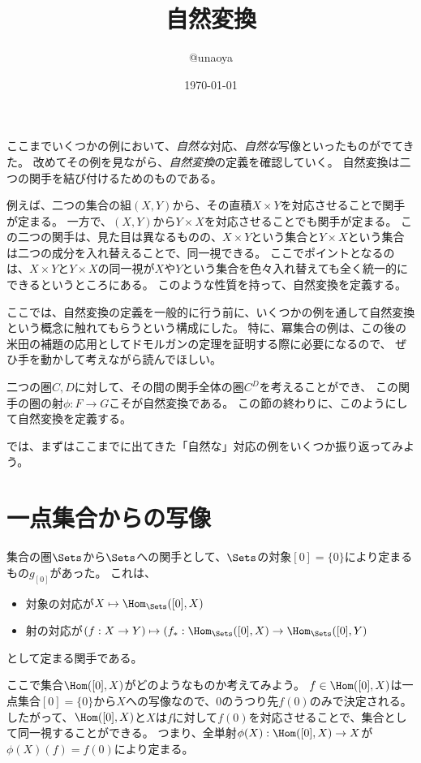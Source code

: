 \documentclass{jsarticle}
\title{自然変換}
\author{@unaoya}
\date{\today}
\begin{document}
\maketitle

ここまでいくつかの例において、\emph{自然な}対応、\emph{自然な}写像といったものがでてきた。
改めてその例を見ながら、\emph{自然変換}の定義を確認していく。
自然変換は二つの関手を結び付けるためのものである。

例えば、二つの集合の組$(X,Y)$から、その直積$X \times Y$を対応させることで関手が定まる。
一方で、$(X, Y)$から$Y \times X$を対応させることでも関手が定まる。
この二つの関手は、見た目は異なるものの、$X \times Y$という集合と$Y \times X$という集合は二つの成分を入れ替えることで、同一視できる。
ここでポイントとなるのは、$X\times Y$と$Y \times X$の同一視が$X$や$Y$という集合を色々入れ替えても全く統一的にできるというところにある。
このような性質を持って、自然変換を定義する。

ここでは、自然変換の定義を一般的に行う前に、いくつかの例を通して自然変換という概念に触れてもらうという構成にした。
特に、冪集合の例は、この後の米田の補題の応用としてドモルガンの定理を証明する際に必要になるので、
ぜひ手を動かして考えながら読んでほしい。

二つの圏$C, D$に対して、その間の関手全体の圏$C^D$を考えることができ、
この関手の圏の射$\phi:F\to G$こそが自然変換である。
この節の終わりに、このようにして自然変換を定義する。

では、まずはここまでに出てきた「自然な」対応の例をいくつか振り返ってみよう。

\section{一点集合からの写像}
集合の圏$\Sets$から$\Sets$への関手として、$\Sets$の対象$[0]=\{0\}$により定まるもの$g_{[0]}$があった。
これは、
\begin{itemize}
\item 対象の対応が$X \mapsto \Hom_{\Sets}([0], X)$
\item 射の対応が$(f:X \to Y) \mapsto (f_*:\Hom_{\Sets}([0],X) \to \Hom_{\Sets}([0],Y)$
\end{itemize}
として定まる関手である。

ここで集合$\Hom([0],X)$がどのようなものか考えてみよう。
$f\in\Hom([0],X)$は一点集合$[0]=\{0\}$から$X$への写像なので、$0$のうつり先$f(0)$のみで決定される。
したがって、$\Hom([0],X)$と$X$は$f$に対して$f(0)$を対応させることで、集合として同一視することができる。
つまり、全単射$\phi(X):\Hom([0],X) \to X$が$\phi(X)(f)=f(0)$により定まる。
\end{document}
